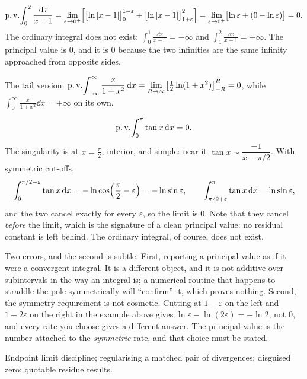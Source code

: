\begin{worked}
\[\operatorname{p.v.}\!\int_0^{2}\frac{\,\mathrm{d} x}{x-1}=\lim_{\varepsilon\to0^{+}}\Bigl[\bigl[\ln\left\lvert x-1\right\rvert\bigr]_0^{1-\varepsilon}+\bigl[\ln\left\lvert x-1\right\rvert\bigr]_{1+\varepsilon}^{2}\Bigr]=\lim_{\varepsilon\to0^{+}}\bigl[\ln\varepsilon+(0-\ln\varepsilon)\bigr]=0.\]
The ordinary integral does not exist: $\int_0^{1}\tfrac{\dd x}{x-1}=-\infty$ and $\int_1^{2}\tfrac{\dd x}{x-1}=+\infty$. The principal value is $0$, and it is $0$ because the two infinities are the same infinity approached from opposite sides.

The tail version: $\operatorname{p.v.}\!\displaystyle\int_{-\infty}^{\infty}\frac{x}{1+x^{2}}\,\mathrm{d} x=\lim_{R\to\infty}\bigl[\tfrac12\ln(1+x^{2})\bigr]_{-R}^{R}=0$, while $\int_0^{\infty}\tfrac{x}{1+x^{2}}\dd x=+\infty$ on its own.
\end{worked}

\begin{worked}
\[\operatorname{p.v.}\!\int_0^{\pi}\tan x\,\mathrm{d} x=0.\]
The singularity is at $x=\tfrac{\pi}{2}$, interior, and simple: near it $\tan x\sim\dfrac{-1}{x-\pi/2}$. With symmetric cut-offs,
\[\int_0^{\pi/2-\varepsilon}\tan x\,\mathrm{d} x=-\ln\cos\Bigl(\frac{\pi}{2}-\varepsilon\Bigr)=-\ln\sin\varepsilon,\qquad \int_{\pi/2+\varepsilon}^{\pi}\tan x\,\mathrm{d} x=\ln\sin\varepsilon,\]
and the two cancel exactly for every $\varepsilon$, so the limit is $0$. Note that they cancel \emph{before} the limit, which is the signature of a clean principal value: no residual constant is left behind. The ordinary integral, of course, does not exist.
\end{worked}

\begin{trap}
Two errors, and the second is subtle. First, reporting a principal value as if it were a convergent integral. It is a different object, and it is not additive over subintervals in the way an integral is; a numerical routine that happens to straddle the pole symmetrically will ``confirm'' it, which proves nothing. Second, the symmetry requirement is not cosmetic. Cutting at $1-\varepsilon$ on the left and $1+2\varepsilon$ on the right in the example above gives $\ln\varepsilon-\ln(2\varepsilon)=-\ln2$, not $0$, and every rate you choose gives a different answer. The principal value is the number attached to the \emph{symmetric} rate, and that choice must be stated.
\end{trap}

\begin{seealsob}Endpoint limit discipline; regularising a matched pair of divergences; disguised zero; quotable residue results.\end{seealsob}

